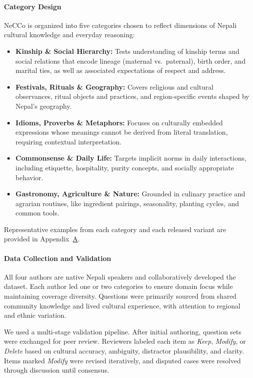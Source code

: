 \documentclass[10pt, a4paper]{article}
\begin{document}
\paragraph{Category Design}
NeCCo is organized into five categories chosen to reflect dimensions of Nepali cultural knowledge and everyday reasoning:

\begin{itemize}
    \item \textbf{Kinship \& Social Hierarchy:} Tests understanding of kinship terms and social relations that encode lineage (maternal vs.\ paternal), birth order, and marital ties, as well as associated expectations of respect and address.
    \item \textbf{Festivals, Rituals \& Geography:} Covers religious and cultural observances, ritual objects and practices, and region-specific events shaped by Nepal’s geography.
    \item \textbf{Idioms, Proverbs \& Metaphors:} Focuses on culturally embedded expressions whose meanings cannot be derived from literal translation, requiring contextual interpretation.
    \item \textbf{Commonsense \& Daily Life:} Targets implicit norms in daily interactions, including etiquette, hospitality, purity concepts, and socially appropriate behavior.
    \item \textbf{Gastronomy, Agriculture \& Nature:} Grounded in culinary practice and agrarian routines, like ingredient pairings, seasonality, planting cycles, and common tools.
\end{itemize}

Representative examples from each category and each released variant are provided in Appendix~\hyperref[app:examples]{A}.

\paragraph{Data Collection and Validation}
All four authors are native Nepali speakers and collaboratively developed the dataset. Each author led one or two categories to ensure domain focus while maintaining coverage diversity. Questions were primarily sourced from shared community knowledge and lived cultural experience, with attention to regional and ethnic variation.

We used a multi-stage validation pipeline. After initial authoring, question sets were exchanged for peer review. Reviewers labeled each item as \textit{Keep}, \textit{Modify}, or \textit{Delete} based on cultural accuracy, ambiguity, distractor plausibility, and clarity. Items marked \textit{Modify} were revised iteratively, and disputed cases were resolved through discussion until consensus.
\end{document}
